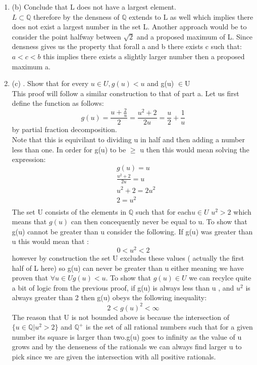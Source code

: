 \documentclass[11pt]{article}
\theoremstyle{definition}  %
\newcommand{\Q}{\mathbb{Q}}
\begin{document}
\begin{enumerate}
\begin{proof}
\end{proof}
  \item (b) Conclude that L does not have a largest element.\\
  $L\subset \mathbb{Q}$ therefore by the densness of $\Q$ extends to L as well which implies there does not exist a largest number in the set L. Another approach would be to consider the point halfway between $\sqrt{2}$ and a proposed maximum of L. Since densness gives us the property that forall a and b there exists c such that: $a<c<b$ this implies there exists a slightly larger number then a proposed maximum a.
  \item (c)
  . Show that for every $u \in  U, g(u) < u$ and g(u) $\in$U\\
  This proof will follow a similar construction to that of part a. Let us first define the function as follows:\\
  \[
    g(u)=\frac{u+\frac{2}{u}}{2}=\frac{u^2+2}{2u}=\frac{u}{2}+\frac{1}{u}
  \]
  by partial fraction decomposition. \\
  Note that this is equivilant to dividing u in half and then adding a number less than one. In order for g(u) to be $\geq $ u then this would mean solving the expression: \[
    g(u)=u
  \]
  \begin{align*}
  &  \frac{u^2+2}{2u}=u\\
  & u^2+2=2u^2\\
  &2=u^2\\
  \end{align*}
  The set U consists of the elements in $\mathbb{Q}$ such that for each$ u\in U$ $u^2>2$  which means that $g(u)$ can then concequently never be equal to u. To show that g(u) cannot be greater than u consider the following. If g(u) was greater than u this would mean that :
  \[
    0<u^2<2
  \]
  however by construction the set U excludes these values ( actually the first half of L here) so g(u) can never be greater than u either meaning we have proven that $\forall u\in U g(u)<u$. To show that $g(u)\in U$ we can recylce quite a bit of logic from the previous proof, if g(u) is always less than u , and $u^2$ is always greater than 2 then g(u) obeys the following inequality:
  \[
    2<g(u)^2<\infty
  \]
  The reason that U is not bounded above is because the intersection of $\{u \in \Q|u^2 > 2\}$ and  $\Q^+$ is the set of all rational numbers such that for a given number its square is larger than two.g(u) goes to infinity as the value of u grows and by the denseness of the rationals we can always find larger u to pick since we are given the intersection with all positive rationals.

\end{enumerate}
\end{document}
